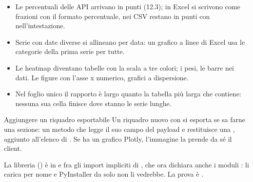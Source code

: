 \begin{itemize}
  \item Le percentuali delle API arrivano in punti (\num{12.3}); in Excel si
    scrivono come frazioni con il formato percentuale, nei CSV restano in punti
    con \cod{(\%)} nell'intestazione.
  \item Serie con date diverse si allineano per data: un grafico a linee di
    Excel usa le categorie della prima serie per tutte.
  \item Le heatmap diventano tabelle con la scala a tre colori; i pesi, le
    barre nei dati. Le figure con l'asse x numerico, grafici a dispersione.
  \item Nel foglio unico il rapporto è largo quanto la tabella più larga che
    contiene: nessuna sua cella finisce dove stanno le serie lunghe.
\end{itemize}

\begin{pratica}{Aggiungere un riquadro esportabile}
Un riquadro nuovo con  si esporta se  sa
farne una sezione: un metodo che legge il suo campo del payload e restituisce
una , aggiunto all'elenco di .
Se ha un grafico Plotly, l'immagine la prende da sé il client.
\end{pratica}

\noindent
La libreria () è in  e fra gli
import impliciti di , che ora dichiara anche i
moduli :  li carica per nome e PyInstaller da
solo non li vedrebbe. La prova è .
